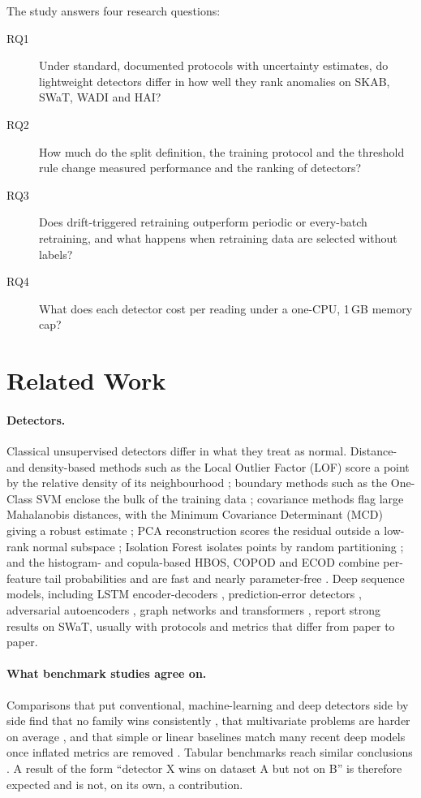 \documentclass[11pt]{article}
\begin{document}
The study answers four research questions:
\begin{description}
\item[RQ1] Under standard, documented protocols with uncertainty estimates, do
lightweight detectors differ in how well they rank anomalies on SKAB, SWaT, WADI and HAI?
\item[RQ2] How much do the split definition, the training protocol and the
threshold rule change measured performance and the ranking of detectors?
\item[RQ3] Does drift-triggered retraining outperform periodic or every-batch
retraining, and what happens when retraining data are selected without labels?
\item[RQ4] What does each detector cost per reading under a one-CPU, 1\,GB
memory cap?
\end{description}

\section{Related Work}
\label{sec:related}

\paragraph{Detectors.} Classical unsupervised detectors differ in what they
treat as normal. Distance- and density-based methods such as the Local Outlier
Factor (LOF) score a point by the relative density of its neighbourhood
\citep{breunig2000}; boundary methods such as the One-Class SVM enclose the
bulk of the training data \citep{scholkopf2001}; covariance methods flag large
Mahalanobis distances, with the Minimum Covariance Determinant (MCD) giving a
robust estimate \citep{rousseeuw1999}; PCA reconstruction scores the residual
outside a low-rank normal subspace \citep{shyu2003}; Isolation Forest isolates
points by random partitioning \citep{liu2008}; and the histogram- and
copula-based HBOS, COPOD and ECOD combine per-feature tail probabilities and are
fast and nearly parameter-free \citep{goldstein2016,li2022ecod,zhao2019}. Deep
sequence models, including LSTM encoder-decoders \citep{malhotra2016},
prediction-error detectors \citep{hundman2018}, adversarial autoencoders
\citep{audibert2020}, graph networks \citep{deng2021} and transformers
\citep{tuli2022}, report strong results on SWaT, usually with protocols and
metrics that differ from paper to paper.

\paragraph{What benchmark studies agree on.} Comparisons that put conventional,
machine-learning and deep detectors side by side find that no family wins
consistently \citep{audibert2022}, that multivariate problems are harder on
average \citep{schmidl2022}, and that simple or linear baselines match many
recent deep models once inflated metrics are removed \citep{sarfraz2024}. Tabular
benchmarks reach similar conclusions \citep{goldstein2016,han2022}. A result of
the form ``detector X wins on dataset A but not on B'' is therefore expected
and is not, on its own, a contribution.
\end{document}
